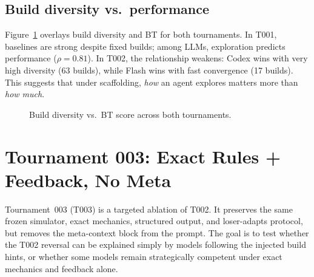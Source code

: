 \documentclass[11pt]{article}
\newcommand{\tOne}{T001}
\newcommand{\tTwo}{T002}
\newcommand{\tThree}{T003}
\begin{document}
\subsection{Build diversity vs.\ performance}

Figure~\ref{fig:diversity_scatter} overlays build diversity and BT for both tournaments.
In \tOne, baselines are strong despite fixed builds; among LLMs, exploration predicts performance ($\rho=0.81$).
In \tTwo, the relationship weakens: Codex wins with very high diversity (63 builds), while Flash wins with fast convergence (17 builds).
This suggests that under scaffolding, \emph{how} an agent explores matters more than \emph{how much}.

\begin{figure}[t]
\centering
{}
\caption{Build diversity vs.\ BT score across both tournaments.}
\label{fig:diversity_scatter}
\end{figure}

\section{Tournament 003: Exact Rules + Feedback, No Meta}
\label{sec:t3}

Tournament~003 (\tThree) is a targeted ablation of \tTwo.
It preserves the same frozen simulator, exact mechanics, structured output, and loser-adapts protocol, but removes the meta-context block from the prompt.
The goal is to test whether the \tTwo{} reversal can be explained simply by models following the injected build hints, or whether some models remain strategically competent under exact mechanics and feedback alone.
\end{document}
